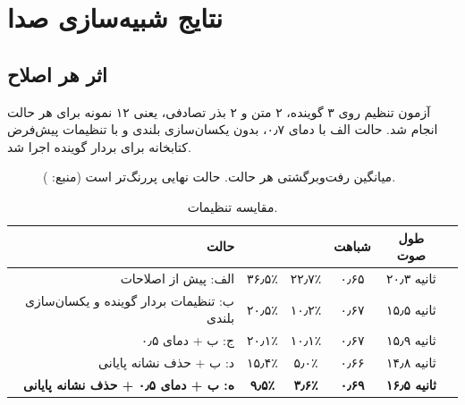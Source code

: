 \documentclass[11pt,a4paper]{article}
\newcommand{\en}[1]{\lr{#1}}
\newcommand{\code}[1]{\lr{\texttt{#1}}}
\begin{document}
\clearpage
\section{نتایج شبیه‌سازی صدا}\label{sec:tts}

\subsection{اثر هر اصلاح}

آزمون تنظیم روی ۳ گوینده، ۲ متن و ۲ بذر تصادفی، یعنی ۱۲ نمونه برای هر حالت انجام شد. حالت الف با دمای ۰٫۷، بدون یکسان‌سازی بلندی و با تنظیمات پیش‌فرض کتابخانه برای بردار گوینده اجرا شد.

\begin{figure}[H]
\centering
\begin{latin}
\end{latin}
\caption{میانگین \en{CER} رفت‌وبرگشتی هر حالت. حالت نهایی پررنگ‌تر است (منبع: \code{results/tune.md}).}
\end{figure}

\begin{table}[H]
\centering\small
\begin{tabular}{r c c c c c}
\toprule
\textbf{حالت} & \en{WER} & \en{CER} & \textbf{شباهت} & \textbf{طول صوت} \\
\midrule
الف: پیش از اصلاحات & ۳۶٫۵٪ & ۲۲٫۷٪ & ۰٫۶۵ & ۲۰٫۳ ثانیه \\
ب: تنظیمات بردار گوینده و یکسان‌سازی بلندی & ۲۰٫۵٪ & ۱۰٫۲٪ & ۰٫۶۷ & ۱۵٫۵ ثانیه \\
ج: ب + دمای ۰٫۵ & ۲۰٫۱٪ & ۱۰٫۱٪ & ۰٫۶۷ & ۱۵٫۹ ثانیه \\
د: ب + حذف نشانه پایانی & ۱۵٫۴٪ & ۵٫۰٪ & ۰٫۶۶ & ۱۴٫۸ ثانیه \\
\textbf{ه: ب + دمای ۰٫۵ + حذف نشانه پایانی} & \textbf{۹٫۵٪} & \textbf{۳٫۶٪} & \textbf{۰٫۶۹} & \textbf{۱۶٫۵ ثانیه} \\
\bottomrule
\end{tabular}
\caption{مقایسه تنظیمات.}
\end{table}
\end{document}
